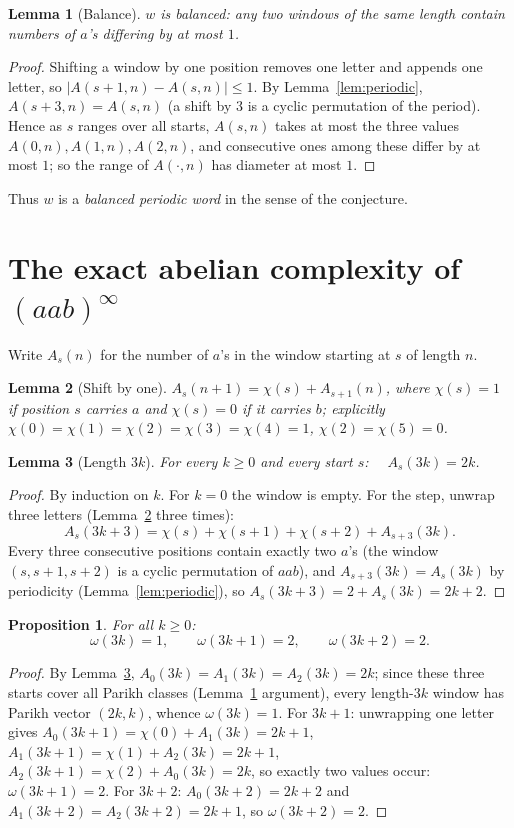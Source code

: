 \documentclass[11pt]{article}
\newtheorem{lemma}{Lemma}
\newtheorem{proposition}{Proposition}
\theoremstyle{definition}
\begin{document}
\begin{lemma}[Balance]\label{lem:balanced}
$w$ is balanced: any two windows of the same length contain numbers of $a$'s
differing by at most $1$.
\end{lemma}
\begin{proof}
Shifting a window by one position removes one letter and appends one letter, so
$|A(s+1,n) - A(s,n)| \le 1$. By Lemma~\ref{lem:periodic}, $A(s+3,n) = A(s,n)$
(a shift by $3$ is a cyclic permutation of the period). Hence as $s$ ranges over
all starts, $A(s,n)$ takes at most the three values $A(0,n), A(1,n), A(2,n)$,
and consecutive ones among these differ by at most $1$; so the range of
$A(\cdot, n)$ has diameter at most $1$.
\end{proof}

Thus $w$ is a \emph{balanced periodic word} in the sense of the conjecture.

\section{The exact abelian complexity of $(aab)^\infty$}

Write $A_s(n)$ for the number of $a$'s in the window starting at $s$ of length
$n$.

\begin{lemma}[Shift by one]\label{lem:step}
$A_s(n+1) = \chi(s) + A_{s+1}(n)$, where $\chi(s) = 1$ if position $s$ carries
$a$ and $\chi(s) = 0$ if it carries $b$; explicitly
$\chi(0)=\chi(1)=\chi(2)=\chi(3)=\chi(4)=1$, $\chi(2)=\chi(5)=0$.
\end{lemma}

\begin{lemma}[Length $3k$]\label{lem:triple}
For every $k \ge 0$ and every start $s$: $\quad A_s(3k) = 2k$.
\end{lemma}
\begin{proof}
By induction on $k$. For $k = 0$ the window is empty. For the step, unwrap
three letters (Lemma~\ref{lem:step} three times):
\[
A_s(3k+3) = \chi(s) + \chi(s{+}1) + \chi(s{+}2) + A_{s+3}(3k).
\]
Every three consecutive positions contain exactly two $a$'s (the window
$(s, s+1, s+2)$ is a cyclic permutation of $aab$), and $A_{s+3}(3k) = A_s(3k)$
by periodicity (Lemma~\ref{lem:periodic}), so $A_s(3k+3) = 2 + A_s(3k) = 2k + 2$.
\end{proof}

\begin{proposition}\label{prop:omega}
For all $k \ge 0$:
\[
\omega(3k) = 1, \qquad \omega(3k+1) = 2, \qquad \omega(3k+2) = 2 .
\]
\end{proposition}
\begin{proof}
By Lemma~\ref{lem:triple}, $A_0(3k) = A_1(3k) = A_2(3k) = 2k$; since these three
starts cover all Parikh classes (Lemma~\ref{lem:balanced} argument), every
length-$3k$ window has Parikh vector $(2k, k)$, whence $\omega(3k) = 1$. For
$3k+1$: unwrapping one letter gives
$A_0(3k{+}1) = \chi(0) + A_1(3k) = 2k{+}1$,
$A_1(3k{+}1) = \chi(1) + A_2(3k) = 2k{+}1$,
$A_2(3k{+}1) = \chi(2) + A_0(3k) = 2k$,
so exactly two values occur: $\omega(3k{+}1) = 2$. For $3k+2$:
$A_0(3k{+}2) = 2k{+}2$ and $A_1(3k{+}2) = A_2(3k{+}2) = 2k{+}1$, so
$\omega(3k{+}2) = 2$.
\end{proof}
\end{document}
